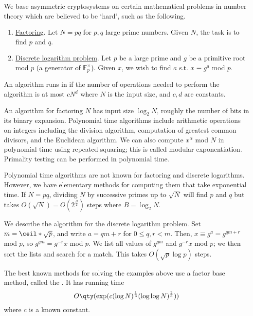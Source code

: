 We base asymmetric cryptosystems on certain mathematical problems in number theory which are believed to be `hard', such as the following.
\begin{enumerate}
    \item \underline{Factoring}.
    Let $N = pq$ for $p, q$ large prime numbers.
    Given $N$, the task is to find $p$ and $q$.
    \item \underline{Discrete logarithm problem}.
    Let $p$ be a large prime and $g$ be a primitive root mod $p$ (a generator of $\mathbb F_p^\times$).
    Given $x$, we wish to find $a$ s.t. $x \equiv g^a$ mod $p$.
\end{enumerate}

\begin{definition}
    An algorithm runs in  if the number of operations needed to perform the algorithm is at most $c N^d$ where $N$ is the input size, and $c, d$ are constants.
\end{definition}

\begin{example}
    An algorithm for factoring $N$ has input size $\log_2 N$, roughly the number of bits in its binary expansion.
    Polynomial time algorithms include arithmetic operations on integers including the division algorithm, computation of greatest common divisors, and the Euclidean algorithm.
    We can also compute $x^\alpha$ mod $N$ in polynomial time using repeated squaring; this is called modular exponentiation.
    Primality testing can be performed in polynomial time.

    Polynomial time algorithms are not known for factoring and discrete logarithms.
    However, we have elementary methods for computing them that take exponential time.
    If $N = pq$, dividing $N$ by successive primes up to $\sqrt{N}$ will find $p$ and $q$ but takes $O(\sqrt{N}) = O(2^{\frac{B}{2}})$ steps where $B = \log_2 N$.

    We describe the  algorithm for the discrete logarithm problem.
    Set $m = \ceil*{\sqrt{p}}$, and write $a = qm + r$ for $0 \leq q, r < m$.
    Then, $x \equiv g^a = g^{qm + r}$ mod $p$, so $g^{qm} = g^{-r} x$ mod $p$.
    We list all values of $g^{qm}$ and $g^{-r}x$ mod $p$; we then sort the lists and search for a match.
    This takes $O(\sqrt{p}\log p)$ steps.

    The best known methods for solving the examples above use a factor base method, called the .
    It has running time
    \begin{align*}
        O\qty(\exp(c (\log N)^{\frac{1}{3}} (\log \log N)^{\frac{2}{3}}))
    \end{align*}
    where $c$ is a known constant.
\end{example}

